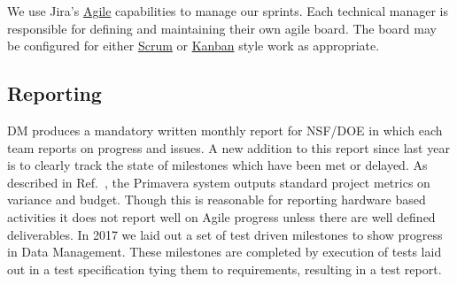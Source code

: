 We use Jira's
\href{https://www.atlassian.com/software/jira/agile}{Agile} capabilities
to manage our sprints. Each technical manager is responsible for
defining and maintaining their own agile board. The board may be
configured for either
\href{https://en.wikipedia.org/wiki/Scrum_(software_development)}{Scrum}
or \href{https://en.wikipedia.org/wiki/Kanban_(development)}{Kanban}
style work as appropriate.

\subsection{Reporting}
DM produces a mandatory written monthly report for NSF/DOE in which each team reports on progress and issues. A new addition to this report since last year is to clearly track the state of milestones which have been met or delayed.
As described in Ref.~, the Primavera system outputs standard project metrics on variance and budget.
Though this is reasonable  for reporting hardware based activities it does not report well on Agile progress unless there are well defined deliverables.
In 2017 we laid out a set of test driven milestones to show progress in Data Management.\cite{LDM-503}
These milestones are completed by execution of tests laid out in a test specification tying them to requirements, resulting in a test report.
